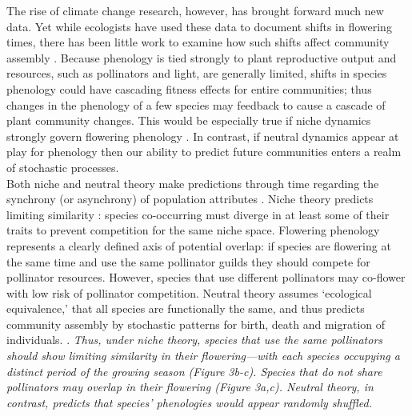 \documentclass[11pt,a4paper]{article}
\begin{document}
The rise of climate change research, however, has brought forward much new data. Yet while ecologists have used these data to document shifts in flowering times, there has been little work to examine how such shifts affect community assembly \citep{wolkovich:2010fee}. Because phenology is tied strongly to plant reproductive output and resources, such as pollinators and light, are generally limited, shifts in species phenology could have cascading fitness effects for entire communities; thus changes in the phenology of a few species may feedback to cause a cascade of plant community changes. This would be especially true if niche dynamics strongly govern flowering phenology \citep{gotelli1996}. In contrast, if neutral dynamics appear at play for phenology then our ability to predict future communities enters a realm of stochastic processes.\\

Both niche and neutral theory make predictions through time regarding the synchrony (or asynchrony) of population attributes \citep{Houlahan:2007qy,Vergnon:2009bh}. Niche theory predicts limiting similarity \citep{ABRAMS:1980dq}: species co-occurring must diverge in at least some of their traits to prevent competition for the same niche space. Flowering phenology represents a clearly defined axis of potential overlap: if species are flowering at the same time and use the same pollinator guilds they should compete for pollinator resources. However, species that use different pollinators may co-flower with low risk of pollinator competition. Neutral theory assumes `ecological equivalence,' that all species are functionally the same, and thus predicts community assembly by stochastic patterns for birth, death and migration of individuals. \citep{Hubbell:2001vo}. \emph{Thus, under niche theory, species that use the same pollinators should show limiting similarity in their flowering---with each species occupying a distinct period of the growing season (Figure 3b-c). Species that do not share pollinators may overlap in their flowering (Figure 3a,c). Neutral theory, in contrast, predicts that species' phenologies would appear randomly shuffled.}\\
\end{document}
